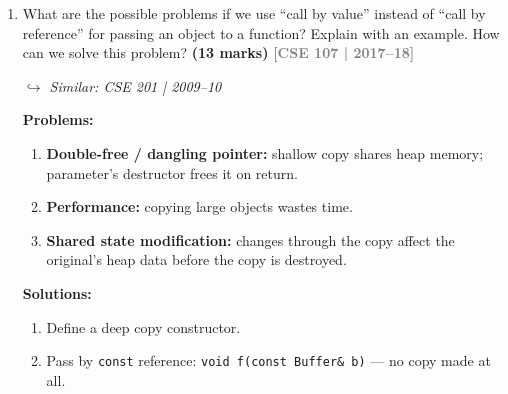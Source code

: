 \documentclass[12pt,a3paper]{article}
\newcommand{\yr}[1]{\hfill\textcolor{gray}{\small\textbf{[#1]}}}
\newcommand{\mk}[1]{\textcolor{orange!70!black}{\small\textbf{(#1 marks)}}}
\newcommand{\variant}[1]{\par\vspace{1pt}\textcolor{blue!50!black}%
  {\footnotesize\textit{$\hookrightarrow$ Similar: #1}}}
\begin{document}
\begin{enumerate}
\begin{tcolorbox}
\textbf{What it does:} Member-wise (shallow) copy --- each data
member copied by value.  For pointer members, only the address is
copied, not the pointed-to data.

\textbf{Problem:} When a class contains a raw pointer to heap memory,
shallow copy makes both objects share the same block.  One object's
destructor frees it; the other is left with a dangling pointer and
causes a double-free crash.

\begin{lstlisting}[language=C++]
class Buffer {
    char *data;
public:
    Buffer(const char* s) { data=new char[strlen(s)+1]; strcpy(data,s); }
    ~Buffer() { delete[] data; }
    // Compiler generates: Buffer(const Buffer& o){ data=o.data; } -- WRONG
};
int main() {
    Buffer b1("Hello");
    Buffer b2 = b1;   // b1.data == b2.data (same pointer!)
    // ~b2: frees data. ~b1: frees same data again -- CRASH
}
\end{lstlisting}

\textbf{Fix:} Write a user-defined deep copy constructor.

\end{tcolorbox}

\item What are the possible problems if we use ``call by value'' instead of ``call by reference'' for passing an object to a function? Explain with an example. How can we solve this problem? \mk{13}
\yr{CSE 107 | 2017--18}
\variant{CSE 201 | 2009--10}

\begin{tcolorbox}[enhanced,breakable,ansbox,colback=cE!4,colframe=cE,
  boxrule=0.8pt,arc=5pt,
  title={\textbf{Answer --- Call-by-value problems for objects; solution}},
  fonttitle=\bfseries\color{white},colbacktitle=cE]

\textbf{Problems:}
\begin{enumerate}[label=\textbf{\arabic*.}]
  \item \textbf{Double-free / dangling pointer:} shallow copy shares
    heap memory; parameter's destructor frees it on return.
  \item \textbf{Performance:} copying large objects wastes time.
  \item \textbf{Shared state modification:} changes through the copy
    affect the original's heap data before the copy is destroyed.
\end{enumerate}

\textbf{Solutions:}
\begin{enumerate}[label=(\roman*)]
  \item Define a deep copy constructor.
  \item Pass by \texttt{const} reference: \texttt{void f(const Buffer\& b)} --- no copy made at all.
\end{enumerate}


\end{tcolorbox}
\end{enumerate}
\end{document}
